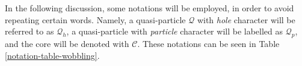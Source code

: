 In the following discussion, some notations will be employed, in order to avoid repeating certain words. Namely, a quasi-particle $\mathcal{Q}$ with \emph{hole} character will be referred to as $\mathcal{Q}_h$, a quasi-particle with \emph{particle} character will be labelled as $\mathcal{Q}_p$, and the core will be denoted with $\mathscr{C}$. These notations can be seen in Table \ref{notation-table-wobbling}.
\begin{table}
    \centering
    \caption{The notations used within the section which describe the QTR, typical for odd-$A$ nuclei.}
    \label{notation-table-wobbling}
\end{table}

